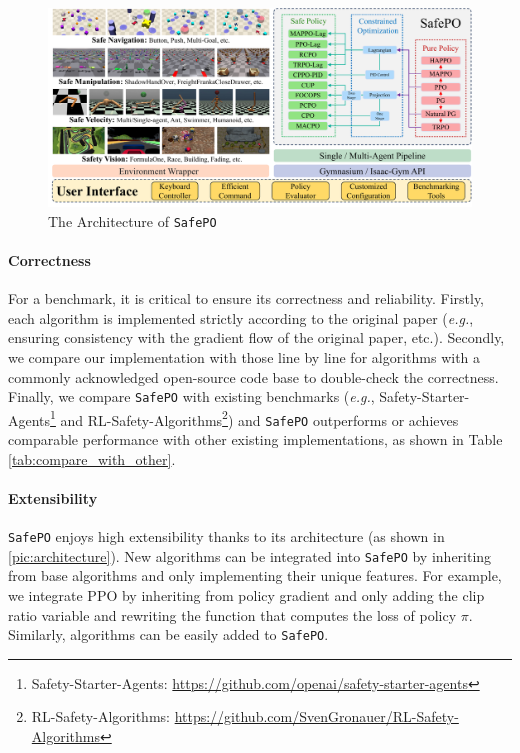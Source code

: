 \documentclass{article}
\begin{document}
\begin{figure}[ht]
  \centering
  \includegraphics[width=\linewidth]{assets/main-paper/arch.pdf}
  \caption{The Architecture of \texttt{SafePO}}
  \label{pic:architecture}
\end{figure}

\paragraph{Correctness} 
For a benchmark, it is critical to ensure its correctness and reliability. 
Firstly, each algorithm is implemented strictly according to the original paper (\textit{e.g.}, ensuring consistency with the gradient flow of the original paper, etc.). Secondly, we compare our implementation with those line by line for algorithms with a commonly acknowledged open-source code base to double-check the correctness. Finally, we compare \texttt{SafePO} with existing benchmarks (\textit{e.g.}, Safety-Starter-Agents\footnote{Safety-Starter-Agents: \url{https://github.com/openai/safety-starter-agents}} and RL-Safety-Algorithms\footnote{RL-Safety-Algorithms: \url{https://github.com/SvenGronauer/RL-Safety-Algorithms}}) and \texttt{SafePO} outperforms or achieves comparable performance with other existing implementations, as shown in Table \ref{tab:compare_with_other}.

\paragraph{Extensibility} 
\texttt{SafePO} enjoys high extensibility thanks to its architecture (as shown in \autoref{pic:architecture}). New algorithms can be integrated into \texttt{SafePO} by inheriting from base algorithms and only implementing their unique features. For example, we integrate PPO by inheriting from policy gradient and only adding the clip ratio variable and rewriting the function that computes the loss of policy $\pi$. Similarly, algorithms can be easily added to \texttt{SafePO}.
\end{document}
